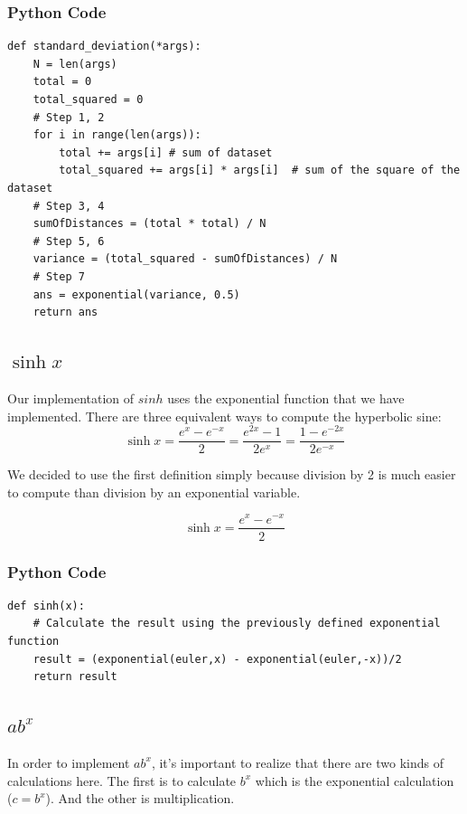 \documentclass[11pt,onside]{report}
\begin{document}
\subsubsection{Python Code}
\begin{lstlisting}
def standard_deviation(*args):
    N = len(args)
    total = 0
    total_squared = 0
    # Step 1, 2
    for i in range(len(args)):
        total += args[i] # sum of dataset
        total_squared += args[i] * args[i]  # sum of the square of the dataset
    # Step 3, 4
    sumOfDistances = (total * total) / N
    # Step 5, 6
    variance = (total_squared - sumOfDistances) / N
    # Step 7
    ans = exponential(variance, 0.5)
    return ans
\end{lstlisting}
\subsection{$\sinh{x}$}

Our implementation of $sinh$ uses the exponential function that we have implemented. There are three equivalent ways to compute the hyperbolic sine:
\begin{equation}
    \sinh{x} = \frac{e^x - e^{-x}}{2} = \frac{e^{2x} - 1}{2e^x} = \frac{1-e^{-2x}}{2e^{-x}}
\end{equation}

We decided to use the first definition simply because division by 2 is much easier to compute than division by an exponential variable.

\begin{equation}
    \sinh{x} = \frac{e^x - e^{-x}}{2}
\end{equation}
\subsubsection{Python Code}
\begin{lstlisting}
def sinh(x):
    # Calculate the result using the previously defined exponential function
    result = (exponential(euler,x) - exponential(euler,-x))/2
    return result
\end{lstlisting}

\subsection{$ab^x$}
In order to implement $ab^x$, it's important to realize that there are two kinds of calculations here. The first is to calculate $b^x$ which is the exponential calculation ($c=b^x$). And the other is multiplication. \\
\end{document}
